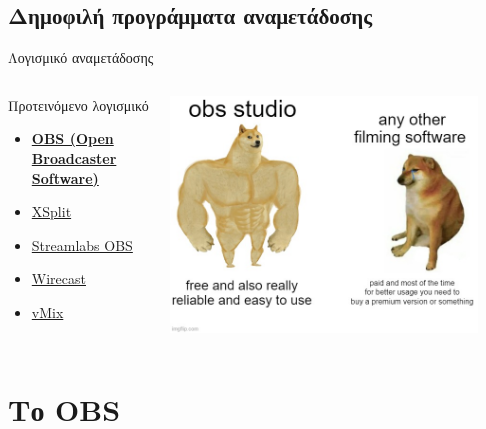 \documentclass[aspectratio=169]{beamer}
\begin{document}
\subsection{Δημοφιλή προγράμματα αναμετάδοσης}
\begin{frame}{Λογισμικό αναμετάδοσης}
  \begin{columns}
    \begin{column}{0.4\textwidth}
      \begin{exampleblock}{Προτεινόμενο λογισμικό}
        \begin{itemize}
          \item \textbf{\href{https://obsproject.com/}{OBS (Open Broadcaster Software)}}
          \item \href{https://www.xsplit.com/}{XSplit}
          \item \href{https://streamlabs.com/}{Streamlabs OBS}
          \item \href{https://www.telestream.net/wirecast/}{Wirecast}
          \item \href{https://www.vmix.com/}{vMix}
        \end{itemize}
      \end{exampleblock}
    \end{column}
    \begin{column}{0.6\textwidth}
      \begin{center}
        \includegraphics[width=0.9\textwidth]{images/meme.jpg}
      \end{center}
    \end{column}
  \end{columns}
\end{frame}
\section{Το OBS}
\end{document}

